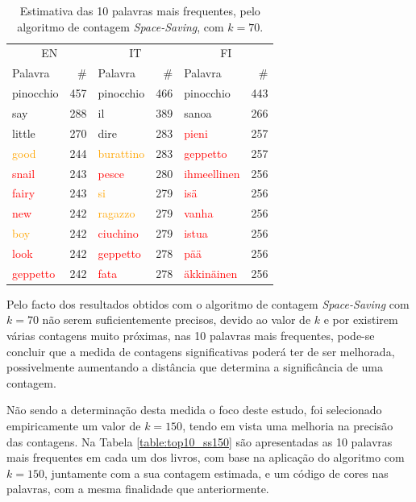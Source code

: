 \documentclass[mirror, portugues]{revdetua}
\begin{document}
\begin{table}[H]
\centering
\caption{Estimativa das 10 palavras mais frequentes, pelo algoritmo de contagem \textit{Space-Saving}, com $k = 70$.}
\label{table:top10_ss70}
\begin{tabular}{lr|lr|lr}
\toprule
\multicolumn{2}{c}{EN} & \multicolumn{2}{c}{IT} & \multicolumn{2}{c}{FI} \\
Palavra & \# & Palavra & \# & Palavra & \# \\
\midrule
pinocchio & 457 & pinocchio & 466 & pinocchio & 443 \\
say & 288 & il & 389 & sanoa & 266 \\
little & 270 & dire & 283 & \textcolor{red}{pieni} & 257 \\
\textcolor{orange}{good} & 244 & \textcolor{orange}{burattino} & 283 & \textcolor{red}{geppetto} & 257 \\
\textcolor{red}{snail} & 243 & \textcolor{red}{pesce} & 280 & \textcolor{red}{ihmeellinen} & 256 \\
\textcolor{red}{fairy} & 243 & \textcolor{orange}{si} & 279 & \textcolor{red}{isä} & 256 \\
\textcolor{red}{new} & 242 & \textcolor{orange}{ragazzo} & 279 & \textcolor{red}{vanha} & 256 \\
\textcolor{orange}{boy} & 242 & \textcolor{red}{ciuchino} & 279 & \textcolor{red}{istua} & 256 \\
\textcolor{red}{look} & 242 & \textcolor{red}{geppetto} & 278 & \textcolor{red}{pää} & 256 \\
\textcolor{red}{geppetto} & 242 & \textcolor{red}{fata} & 278 & \textcolor{red}{äkkinäinen} & 256 \\
\bottomrule
\end{tabular}
\end{table}

Pelo facto dos resultados obtidos com o algoritmo de contagem \textit{Space-Saving} com $k = 70$ não serem suficientemente precisos, devido ao valor de $k$ e por existirem várias contagens muito próximas, nas 10 palavras mais frequentes, pode-se concluir que a medida de contagens significativas poderá ter de ser melhorada, possivelmente aumentando a distância que determina a significância de uma contagem.

Não sendo a determinação desta medida o foco deste estudo, foi selecionado empiricamente um valor de $k = 150$, tendo em vista uma melhoria na precisão das contagens. Na Tabela \ref{table:top10_ss150} são apresentadas as 10 palavras mais frequentes em cada um dos livros, com base na aplicação do algoritmo com $k = 150$, juntamente com a sua contagem estimada, e um código de cores nas palavras, com a mesma finalidade que anteriormente.
\end{document}
